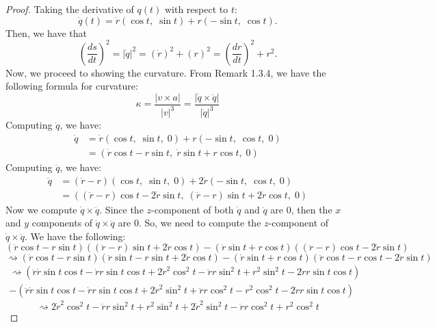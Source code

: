 \documentclass[12pt]{article}
\newcommand\abs[1]{\left| #1 \right|}
\newcommand\parens[1]{\left( #1 \right)}
\newcommand\solproof[1]{\begin{mdframed}
\begin{proof} #1
\end{proof}
\end{mdframed}}
\begin{document}
\solproof{
    Taking the derivative of $q(t)$ with respect to $t$:
    \[\dot{q}(t) = \dot{r}\parens{\cos t,\; \sin t} + r(- \sin t,\; \cos t).\]
    Then, we have that 
    \[\parens{\frac{ds}{dt}}^2 = \abs{\dot{q}}^2 = \parens{\dot{r}}^2 + \parens{r}^2 = \parens{\frac{dr}{dt}}^2 + r^2.\]
    Now, we proceed to showing the curvature. From Remark 1.3.4, we have the following formula for curvature:
    \begin{equation*}\label{eq:1.3.10}\tag{eq. 1.3.10}
        \kappa = \frac{\abs{v \times a}}{\abs{v}^3} = \frac{\abs{\dot{q} \times \ddot{q}}}{\abs{\dot{q}}^3}
    \end{equation*}
    Computing $\dot{q}$, we have:
    \begin{align*}
        \dot{q} &= \dot{r}\parens{\cos t,\; \sin t,\; 0} + r\parens{-\sin t,\; \cos t,\; 0} \\
        &= \parens{\dot{r}\cos t - r\sin t,\; \dot{r}\sin t + r\cos t,\; 0}
    \end{align*}
    Computing $\ddot{q}$, we have:
    \begin{align*}
        \ddot{q} &= \parens{\ddot{r} - r}\parens{\cos t,\; \sin t,\; 0} + 2\dot{r}\parens{-\sin t,\; \cos t,\; 0} \\
        &= \parens{\parens{\ddot{r}-r}\cos t - 2\dot{r}\sin t,\; \parens{\ddot{r} - r}\sin t + 2\dot{r}\cos t,\; 0}
    \end{align*}
    Now we compute $\dot{q} \times \ddot{q}$. Since the $z$-component of both $\dot{q}$ and $\ddot{q}$ are $0$, then the $x$ and $y$ components of $\dot{q} \times \ddot{q}$ are $0$. So, we need to compute the $z$-component of $\dot{q} \times \ddot{q}$. We have the following:
    \[\parens{\dot{r}\cos t - r\sin t}\parens{\parens{\ddot{r}-r}\sin t + 2\dot{r}\cos t} - \parens{\dot{r}\sin t + r\cos t}\parens{\parens{\ddot{r} - r}\cos t - 2\dot{r}\sin t}\]
    \[\rightsquigarrow \parens{\dot{r}\cos t - r \sin t}\parens{\ddot{r}\sin t - r\sin t + 2\dot{r}\cos t} - \parens{\dot{r}\sin t + r\cos t}\parens{\ddot{r}\cos t - r\cos t - 2\dot{r}\sin t}\]
    \begin{multline*}
        \rightsquigarrow \parens{\ddot{r}\dot{r}\sin t\cos t - \dot{r}r\sin t\cos t + 2\dot{r}^2\cos^2 t - \ddot{r}r\sin^2 t + r^2\sin^2 t - 2\dot{r}r\sin t\cos t} \\
        - \parens{\ddot{r}\dot{r}\sin t\cos t - \dot{r}r\sin t\cos t + 2\dot{r}^2\sin^2 t + \ddot{r}r\cos^2 t - r^2\cos^2 t - 2\dot{r}r\sin t\cos t}
    \end{multline*}
    \[\rightsquigarrow 2\dot{r}^2\cos^2t - \ddot{r}r\sin^2t + r^2\sin^2t + 2\dot{r}^2\sin^2t - \ddot{r}r\cos^2t + r^2\cos^2t\]
}
\end{document}
